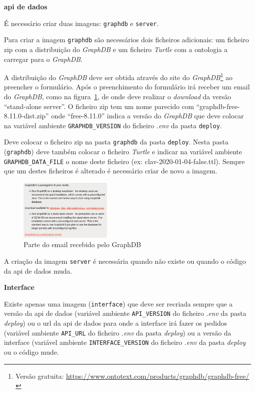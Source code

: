 \begin{description}
    \item \textbf{\acrshort{api} de dados}

    É necessário criar duas imagens: \texttt{graphdb} e \texttt{server}.

    Para criar a imagem \texttt{graphdb} são necessários dois ficheiros adicionais: um ficheiro zip com a distribuição do \textit{GraphDB} e um ficheiro \textit{Turtle} com a ontologia a carregar para o \textit{GraphDB}. 
    
    A distribuição do \textit{GraphDB} deve ser obtida através do site do \textit{GraphDB}\footnote{Versão gratuita: \url{https://www.ontotext.com/products/graphdb/graphdb-free/}} ao preencher o formulário. Após o preenchimento do formulário irá receber um email do \textit{GraphDB}, como na figura~\ref{fig:graphdb_email}, de onde deve realizar o \textit{download} da versão ``stand-alone server''. O ficheiro zip tem um nome parecido com ``graphdb-free-8.11.0-dist.zip'' onde ``free-8.11.0'' indica a versão do \textit{GraphDB} que deve colocar na variável ambiente \texttt{GRAPHDB\_VERSION} do ficheiro \textit{.env} da pasta \texttt{deploy}. 
    
    Deve colocar o ficheiro zip na pasta \texttt{graphdb} da pasta \texttt{deploy}. Nesta pasta (\texttt{graphdb}) deve também colocar o ficheiro \textit{Turtle} e indicar na variável ambiente \texttt{GRAPHDB\_DATA\_FILE} o nome deste ficheiro (ex: clav-2020-01-04-false.ttl). Sempre que um destes ficheiros é alterado é necessário criar de novo a imagem.

    \begin{figure}[H]
        \centering
        \includegraphics[width=0.4\textwidth]{img/graphdb_email.png}
        \caption{Parte do email recebido pelo GraphDB\label{fig:instalacao-email}\label{fig:graphdb_email}}
    \end{figure}

    A criação da imagem \texttt{server} é necessária quando não existe ou quando o código da \acrshort{api} de dados muda.

    \item \textbf{Interface}

    Existe apenas uma imagem (\texttt{interface}) que deve ser recriada sempre que a versão da \acrshort{api} de dados (variável ambiente \texttt{API\_VERSION} do ficheiro \textit{.env} da pasta \textit{deploy}) ou o \acrshort{url} da \acrshort{api} de dados para onde a interface irá fazer os pedidos (variável ambiente \texttt{API\_URL} do ficheiro \textit{.env} da pasta \textit{deploy}) ou a versão da interface (variável ambiente \texttt{INTERFACE\_VERSION} do ficheiro \textit{.env} da pasta \textit{deploy} ou o código mude.
\end{description}

